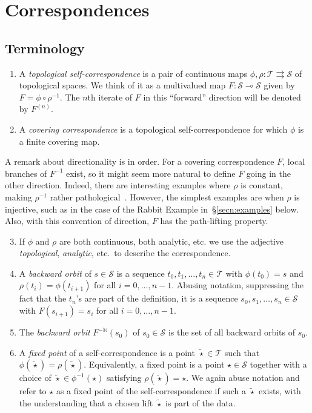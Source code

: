 \documentclass{amsart}
\newcommand\N{{\mathbb{N}}}
\theoremstyle{definition}
\theoremstyle{remark}
\newcommand{\cT}{\mathcal{T}}
\newcommand{\cS}{\mathcal{S}}
\begin{document}
\section{Correspondences}\label{secn:correspondences}

\subsection{Terminology}
\begin{enumerate}
\item A \emph{topological self-correspondence} is a pair of continuous maps $\phi, \rho\colon \cT \rightrightarrows\cS$ of topological spaces.  We think of it as a multivalued map $F\colon \cS \multimap \cS$ given by $F=\phi \circ \rho^{-1}$. The $n$th iterate of $F$ in this ``forward'' direction will be denoted by $F^{(n)}$.  
\item A \emph{covering correspondence} is a topological self-correspondence for which $\phi$ is a finite covering map. 
\end{enumerate}

A remark about directionality is in order. For a covering correspondence $F$, local branches of $F^{-1}$ exist, so it might seem more natural to define $F$ going in the other direction. Indeed, there are interesting examples where $\rho$ is constant, making $\rho^{-1}$ rather pathological~\cite{MR2508269}. However, the simplest examples are when $\rho$ is injective, such as in the case of the Rabbit Example in~\S\ref{secn:examples} below.  Also, with this convention of direction, $F$ has the path-lifting property. 

\begin{enumerate}
\setcounter{enumi}{2}
\item If $\phi$ and $\rho$ are both continuous, both analytic, etc. we use the adjective  \emph{topological}, \emph{analytic}, etc.\ to describe the correspondence.
\item A \emph{backward orbit} of $s\in\cS$ is a sequence $t_0, t_1,\ldots,t_n\in \cT$ with $\phi(t_0)=s$ and $\rho(t_i)=\phi(t_{i+1})$ for all $i=0,\dots,n-1$.  Abusing notation, suppressing the fact that the $t_n$'s are part of the definition, it is a sequence $s_0, s_1,\ldots,s_n\in \cS$ with $F(s_{i+1})=s_i$ for all $i=0,\dots,n-1$.
\item The \emph{backward orbit} $F^{-\N}(s_0)$ of $s_0\in \cS$ is the set of all backward orbits of $s_0$.
\item A \emph{fixed point} of a self-correspondence is a point $\tilde{\star}\in \cT$ such that $\phi(\tilde{\star})=\rho(\tilde{\star})$.  Equivalently, a fixed point is  a point $\star\in \cS$ together with a choice of $\tilde{\star}\in \phi^{-1}(\star)$ satisfying $\rho(\tilde{\star})=\star$. We again abuse notation and refer to $\star$ as a fixed point of the self-correspondence if such a $\tilde\star$ exists, with the understanding that a chosen lift $\tilde{\star}$ is part of the data. 
\end{enumerate}
\end{document}
